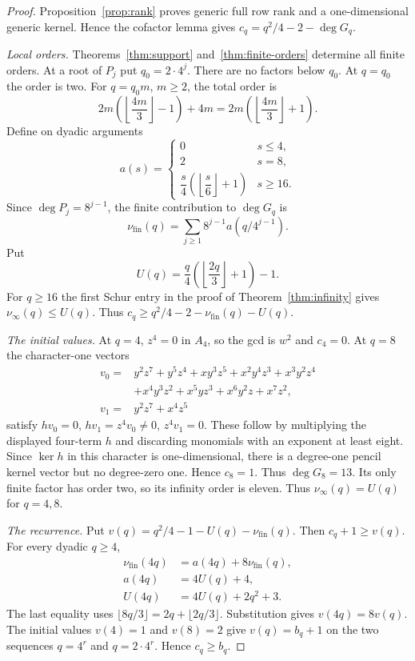 \documentclass[11pt,a4paper,reqno]{amsart}
\numberwithin{equation}{section}
\theoremstyle{plain}
\theoremstyle{definition}
\theoremstyle{remark}
\begin{document}
\begin{proof}
Proposition~\ref{prop:rank} proves generic full row rank and a one-dimensional generic kernel. Hence the cofactor lemma gives
$c_q=q^2/4-2-\deg G_q$.

\emph{Local orders.}
Theorems~\ref{thm:support} and~\ref{thm:finite-orders} determine all finite orders. At a root of $P_j$ put $q_0=2\cdot4^j$. There are no factors below $q_0$. At $q=q_0$ the order is two. For $q=q_0m$, $m\geq2$, the total order is
\[
2m\left(\left\lfloor\frac{4m}{3}\right\rfloor-1\right)+4m
=2m\left(\left\lfloor\frac{4m}{3}\right\rfloor+1\right).
\]
Define on dyadic arguments
\[
a(s)=\begin{cases}0&s\leq4,\\2&s=8,\\
\dfrac s4\left(\left\lfloor\dfrac s6\right\rfloor+1\right)&s\geq16.
\end{cases}
\]
Since $\deg P_j=8^{j-1}$, the finite contribution to $\deg G_q$ is
\[
\nu_{\mathrm{fin}}(q)=\sum_{j\geq1}8^{j-1}a(q/4^{j-1}).
\]
Put
\[
 U(q)=\frac q4\left(\left\lfloor\frac{2q}{3}\right\rfloor+1\right)-1.
\]
For $q\geq16$ the first Schur entry in the proof of
Theorem~\ref{thm:infinity} gives $\nu_\infty(q)\leq U(q)$.
Thus $c_q\geq q^2/4-2-\nu_{\mathrm{fin}}(q)-U(q)$.

\emph{The initial values.}
At $q=4$, $z^4=0$ in $A_4$, so the gcd is $w^2$ and $c_4=0$. At $q=8$ the character-one vectors
\begin{align*}
v_0={}&y^2z^7+y^5z^4+xy^3z^5+x^2y^4z^3+x^3y^2z^4\\
&+x^4y^3z^2+x^5yz^3+x^6y^2z+x^7z^2,\\
v_1={}&y^2z^7+x^4z^5
\end{align*}
satisfy $hv_0=0$, $hv_1=z^4v_0\ne0$, $z^4v_1=0$. These follow by multiplying the displayed four-term $h$ and discarding monomials with an exponent at least eight. Since $\ker h$ in this character is one-dimensional, there is a degree-one pencil kernel vector but no degree-zero one. Hence $c_8=1$. Thus $\deg G_8=13$. Its only finite factor has order two, so its infinity order is eleven. Thus $\nu_\infty(q)=U(q)$ for $q=4,8$.

\emph{The recurrence.}
Put $v(q)=q^2/4-1-U(q)-\nu_{\mathrm{fin}}(q)$. Then $c_q+1\geq v(q)$.
For every dyadic $q\geq4$,
\[
\begin{aligned}
\nu_{\mathrm{fin}}(4q)&=a(4q)+8\nu_{\mathrm{fin}}(q),\\
a(4q)&=4U(q)+4,\\
U(4q)&=4U(q)+2q^2+3.
\end{aligned}
\]
The last equality uses $\lfloor8q/3\rfloor=2q+\lfloor2q/3\rfloor$.
Substitution gives $v(4q)=8v(q)$. The initial values $v(4)=1$
and $v(8)=2$ give $v(q)=b_q+1$ on the two sequences
$q=4^r$ and $q=2\cdot4^r$. Hence $c_q\geq b_q$.
\end{proof}
\end{document}

